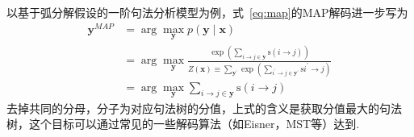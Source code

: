 以基于弧分解假设的一阶句法分析模型为例，式~\ref{eq:map}的MAP解码进一步写为
\begin{equation}
  \label{eq:map-dep}
  \begin{split}
    \boldsymbol{y}^{MAP}&=\arg\max_{\boldsymbol{y}}p(\boldsymbol{y}\mid\boldsymbol{x})\\
    &=\arg\max_{\boldsymbol{y}}\frac{\exp{\left(\sum_{i\rightarrow j\in \boldsymbol{y}}\mathrm{s}(i\rightarrow j)\right)}}{Z(\boldsymbol{x})\equiv \sum_{\boldsymbol{y}^{\prime}}\exp{\left(\sum_{i^{\prime}\rightarrow j\in \boldsymbol{y}^{\prime}}\mathrm{s}i^{\prime}\rightarrow j\right)}}\\
    &=\arg\max_{\boldsymbol{y}}\sum_{i\rightarrow j\in \boldsymbol{y}}\mathrm{s}(i\rightarrow j)
  \end{split}
\end{equation}
去掉共同的分母，分子为对应句法树的分值，上式的含义是获取分值最大的句法树，这个目标可以通过常见的一些解码算法（如Eisner，MST等）达到.

